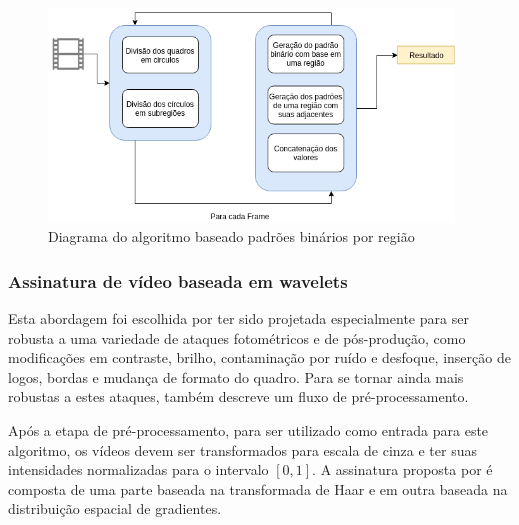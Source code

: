  \begin{figure}[h]
      \centering
      \includegraphics[width=0.96\textwidth]{dados/figuras/RBP.png}
      \caption{Diagrama do algoritmo baseado padrões binários por região}
       	\label{fig:dia_rbp}
    \end{figure}  

    
%
%

\subsubsection{Assinatura de vídeo baseada em wavelets}
\label{wavelets}

Esta abordagem foi escolhida por ter sido projetada especialmente para ser robusta a uma variedade de ataques fotométricos e de pós-produção, como modificações em contraste, brilho, contaminação por ruído e desfoque, inserção de logos, bordas e mudança de formato do quadro. Para se tornar ainda mais robustas a estes ataques, \citeauthor{Dutta2013} também descreve um fluxo de pré-processamento.

Após a etapa de pré-processamento, para ser utilizado como entrada para este algoritmo, os vídeos devem ser transformados para escala de cinza e ter suas intensidades normalizadas para o intervalo $[0,1]$. A assinatura proposta por \citeauthor{Dutta2013} é composta de uma parte baseada na transformada de Haar e em  outra baseada na distribuição espacial de gradientes.


